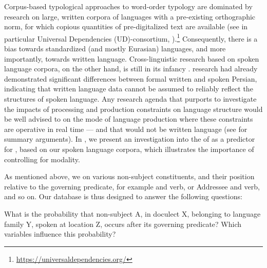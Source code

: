 \documentclass[output=paper,colorlinks,citecolor=brown,collectionchapter]{langscibook}
\begin{document}
Corpus-based typological approaches to word-order typology are dominated by research on large, written corpora of languages with a pre-existing orthographic norm, for which copious quantities of pre-digitalized text are available (see in particular Universal Dependencies (UD)-consortium, \citealt{nivre_universal_2020}).\footnote{\url{https://universaldependencies.org/}} Consequently, there is a bias towards standardized (and mostly Eurasian) languages, and more importantly, towards written language. Cross-linguistic research based on spoken language corpora, on the other hand, is still in its infancy \citep[see among others][]{Schnelletal2021documentation,mettouchi2021prosodic,SchnellSchiborr2022Cross,seifart2022doreco,levshina_why_2023}.  research had already demonstrated significant differences between formal written and spoken Persian, indicating that written language data cannot be assumed to reliably reflect the structures of spoken language. Any research agenda that purports to investigate the impacts of processing and production constraints on language structure would be well advised to  on the mode of language production where these constraints are operative in real time --- and that would not be written language (see \citealt{Schnelletal2021documentation} for summary arguments). In , we present an investigation into the  of  as a predictor for , based on our spoken language corpora, which illustrates the importance of controlling for modality.

As mentioned above, we  on various non-subject constituents, and their position relative to the governing predicate, for example  and verb, or Addressee and verb, and so on. Our database is thus designed to answer the following questions: 

\ea
\ea\label{Intro:ex:1a}
What is the probability that non-subject  A, in doculect X, belonging to language family Y, spoken at location Z, occurs after its governing predicate?
\ex\label{Intro:ex:1b}
Which variables influence this probability?
\z
\z
\end{document}
